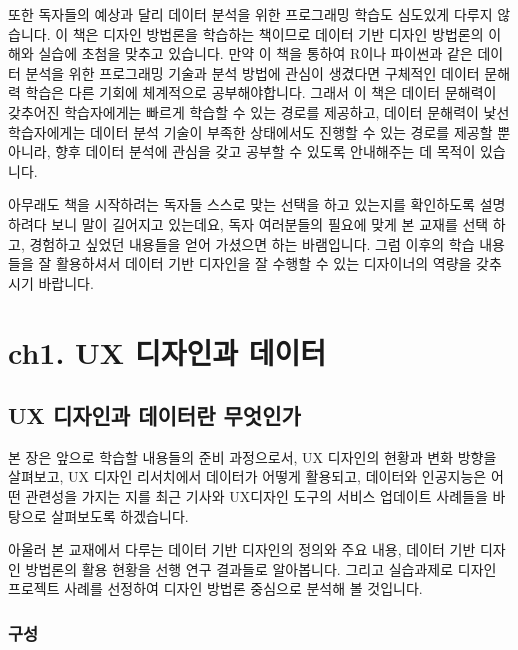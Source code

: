 \documentclass[
  letterpaper,
]{book}
\begin{document}
또한 독자들의 예상과 달리 데이터 분석을 위한 프로그래밍 학습도 심도있게
다루지 않습니다. 이 책은 디자인 방법론을 학습하는 책이므로 데이터 기반
디자인 방법론의 이해와 실습에 초첨을 맞추고 있습니다. 만약 이 책을
통하여 R이나 파이썬과 같은 데이터 분석을 위한 프로그래밍 기술과 분석
방법에 관심이 생겼다면 구체적인 데이터 문해력 학습은 다른 기회에
체계적으로 공부해야합니다. 그래서 이 책은 데이터 문해력이 갖추어진
학습자에게는 빠르게 학습할 수 있는 경로를 제공하고, 데이터 문해력이 낯선
학습자에게는 데이터 분석 기술이 부족한 상태에서도 진행할 수 있는 경로를
제공할 뿐 아니라, 향후 데이터 분석에 관심을 갖고 공부할 수 있도록
안내해주는 데 목적이 있습니다.

아무래도 책을 시작하려는 독자들 스스로 맞는 선택을 하고 있는지를
확인하도록 설명하려다 보니 말이 길어지고 있는데요, 독자 여러분들의
필요에 맞게 본 교재를 선택 하고, 경험하고 싶었던 내용들을 얻어 가셨으면
하는 바램입니다. 그럼 이후의 학습 내용들을 잘 활용하셔서 데이터 기반
디자인을 잘 수행할 수 있는 디자이너의 역량을 갖추시기 바랍니다.


\chapter{}\label{section}

\part{ch1. UX 디자인과 데이터}

\chapter{UX 디자인과 데이터란
무엇인가}\label{ux-uxb514uxc790uxc778uxacfc-uxb370uxc774uxd130uxb780-uxbb34uxc5c7uxc778uxac00}

본 장은 앞으로 학습할 내용들의 준비 과정으로서, UX 디자인의 현황과 변화
방향을 살펴보고, UX 디자인 리서치에서 데이터가 어떻게 활용되고, 데이터와
인공지능은 어떤 관련성을 가지는 지를 최근 기사와 UX디자인 도구의 서비스
업데이트 사례들을 바탕으로 살펴보도록 하겠습니다.

아울러 본 교재에서 다루는 데이터 기반 디자인의 정의와 주요 내용, 데이터
기반 디자인 방법론의 활용 현황을 선행 연구 결과들로 알아봅니다. 그리고
실습과제로 디자인 프로젝트 사례를 선정하여 디자인 방법론 중심으로 분석해
볼 것입니다.

\section{구성}\label{uxad6cuxc131}
\end{document}
